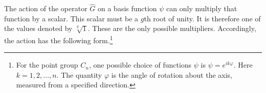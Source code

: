 The action of the operator $\widehat G$ on a basis function $\psi$ can only multiply that function by a scalar.
This scalar must be a $g$th root of unity.
It is therefore one of the values denoted by $\sqrt[g]{1}$.
These are the only possible multipliers.
Accordingly, the action has the following form.\footnote{For the point group $C_n$, one possible choice of functions $\psi$ is $\psi=e^{ik\varphi}$. Here $k=1,2,\ldots,n$. The quantity $\varphi$ is the angle of rotation about the axis, measured from a specified direction.}
